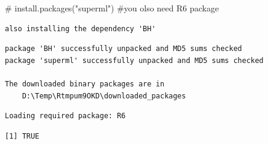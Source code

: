 \documentclass[
  letterpaper,
  DIV=11,
  numbers=noendperiod]{scrreprt}
\newenvironment{Shaded}{\begin{snugshade}}{\end{snugshade}}
\newcommand{\CommentTok}[1]{\textcolor[rgb]{0.37,0.37,0.37}{#1}}
\newcommand{\FunctionTok}[1]{\textcolor[rgb]{0.28,0.35,0.67}{#1}}
\newcommand{\NormalTok}[1]{\textcolor[rgb]{0.00,0.23,0.31}{#1}}
\newcommand{\OtherTok}[1]{\textcolor[rgb]{0.00,0.23,0.31}{#1}}
\newcommand{\SpecialCharTok}[1]{\textcolor[rgb]{0.37,0.37,0.37}{#1}}
\begin{document}
\begin{Shaded}
\begin{Highlighting}[]
\CommentTok{\# install.packages("superml") \#you olso need R6 package}
\end{Highlighting}
\end{Shaded}

\begin{verbatim}
also installing the dependency 'BH'

\end{verbatim}

\begin{verbatim}
package 'BH' successfully unpacked and MD5 sums checked
package 'superml' successfully unpacked and MD5 sums checked

The downloaded binary packages are in
    D:\Temp\Rtmpum9OKD\downloaded_packages
\end{verbatim}

\begin{Shaded}
\end{Shaded}

\begin{verbatim}
Loading required package: R6
\end{verbatim}

\begin{verbatim}
[1] TRUE
\end{verbatim}

\begin{Shaded}
\end{Shaded}
\end{document}
